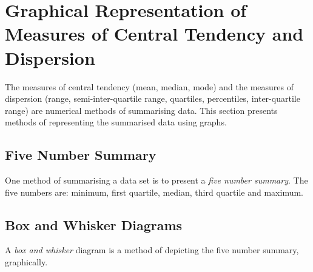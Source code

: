\section[Graphical Representation of Measures of Central Tendency and Dispersion]{\Huge Graphical Representation of Measures of Central Tendency and Dispersion}

The measures of central tendency (mean, median, mode) and the measures of dispersion (range, semi-inter-quartile range, quartiles, percentiles, inter-quartile range) are numerical methods of summarising data. This section presents methods of representing the summarised data using graphs.

\subsection{Five Number Summary}
One method of summarising a data set is to present a \textit{five number summary}. The five numbers are: minimum, first quartile, median, third quartile and maximum.

\subsection{Box and Whisker Diagrams}
A \textit{box and whisker} diagram is a method of depicting the five number summary, graphically.

